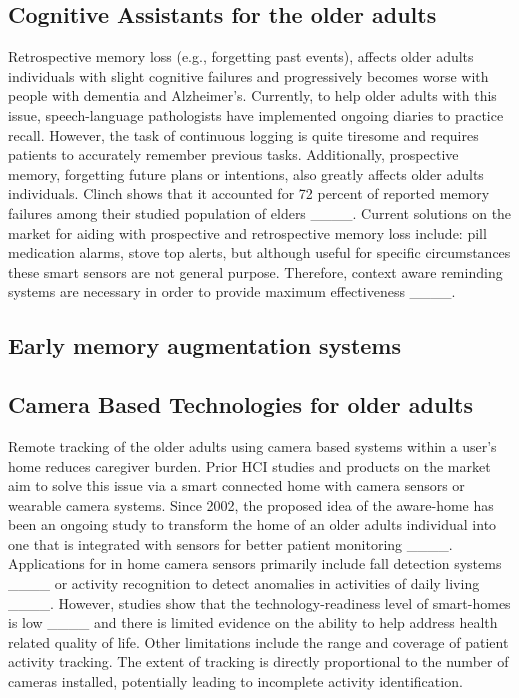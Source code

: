 \iffalse

\subsection{Cognitive Assistants for the older adults}

Retrospective memory loss (e.g., forgetting past events), affects older adults individuals with slight cognitive failures and progressively becomes worse with people with dementia and Alzheimer’s. Currently, to help older adults with this issue, speech-language pathologists have implemented ongoing diaries to practice recall. However, the task of continuous logging is quite tiresome and requires patients to accurately remember previous tasks. Additionally, prospective memory, forgetting future plans or intentions, also greatly affects older adults individuals. Clinch shows that it accounted for 72 percent of reported memory failures among their studied population of elders ____. Current solutions on the market for aiding with prospective and retrospective memory loss include: pill medication alarms, stove top alerts, but although useful for specific circumstances these smart sensors are not general purpose. Therefore, context aware reminding systems are necessary in order to provide maximum effectiveness ____.   

\subsection{Early memory augmentation systems}

\subsection{Camera Based Technologies for older adults }

Remote tracking of the older adults using camera based systems within a user's home reduces caregiver burden. Prior HCI studies and products on the market aim to solve this issue via a smart connected home with camera sensors or wearable camera systems. Since 2002, the proposed idea of the aware-home has been an ongoing study to transform the home of an older adults individual into one that is integrated with sensors for better patient monitoring ____. Applications for in home camera sensors primarily include fall detection systems ____ or activity recognition to detect anomalies in activities of daily living ____. However, studies show that the technology-readiness level of smart-homes is low ____ and there is limited evidence on the ability to help address health related quality of life. Other limitations include the range and coverage of patient activity tracking. The extent of tracking is directly proportional to the number of cameras installed, potentially leading to incomplete activity identification. 

